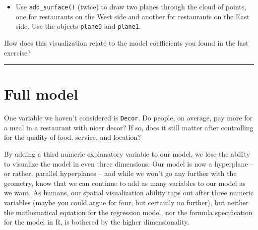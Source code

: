 \documentclass[]{book}
\newenvironment{Shaded}{\begin{snugshade}}{\end{snugshade}}
\newcommand{\KeywordTok}[1]{\textcolor[rgb]{0.13,0.29,0.53}{\textbf{#1}}}
\newcommand{\DataTypeTok}[1]{\textcolor[rgb]{0.13,0.29,0.53}{#1}}
\newcommand{\StringTok}[1]{\textcolor[rgb]{0.31,0.60,0.02}{#1}}
\newcommand{\CommentTok}[1]{\textcolor[rgb]{0.56,0.35,0.01}{\textit{#1}}}
\newcommand{\OtherTok}[1]{\textcolor[rgb]{0.56,0.35,0.01}{#1}}
\newcommand{\OperatorTok}[1]{\textcolor[rgb]{0.81,0.36,0.00}{\textbf{#1}}}
\newcommand{\NormalTok}[1]{#1}
\providecommand{\tightlist}{%
  \setlength{\itemsep}{0pt}\setlength{\parskip}{0pt}}
\begin{document}
\hypertarget{htmlwidget-9a853aba44393acce257}{}

\begin{itemize}
\tightlist
\item
  Use \texttt{add\_surface()} (twice) to draw two planes through the
  cloud of points, one for restaurants on the West side and another for
  restaurants on the East side. Use the objects \texttt{plane0} and
  \texttt{plane1}.
\end{itemize}

\begin{Shaded}
\end{Shaded}

\hypertarget{htmlwidget-03bd35ff25d219ccbead}{}

How does this visualization relate to the model coefficients you found
in the last exercise?

\begin{center}\rule{0.5\linewidth}{\linethickness}\end{center}

\section{Full model}\label{full-model}

One variable we haven't considered is \texttt{Decor}. Do people, on
average, pay more for a meal in a restaurant with nicer decor? If so,
does it still matter after controlling for the quality of food, service,
and location?

By adding a third numeric explanatory variable to our model, we lose the
ability to visualize the model in even three dimensions. Our model is
now a hyperplane -- or rather, parallel hyperplanes -- and while we
won't go any further with the geometry, know that we can continue to add
as many variables to our model as we want. As humans, our spatial
visualization ability taps out after three numeric variables (maybe you
could argue for four, but certainly no further), but neither the
mathematical equation for the regression model, nor the formula
specification for the model in R, is bothered by the higher
dimensionality.
\end{document}
